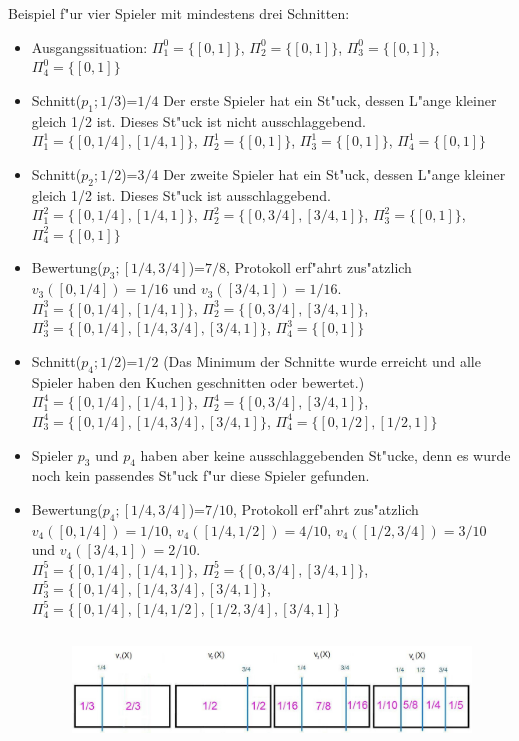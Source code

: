 \documentclass[11pt, a4paper, twoside]{article}
\numberwithin{equation}{section}
\begin{document}
\newline
Beispiel f"ur vier Spieler mit mindestens drei Schnitten:
\begin{itemize}
\item Ausgangssituation: $\Pi_1^0=\{[0,1]\}$, $\Pi_2^0=\{[0,1]\}$, $\Pi_3^0=\{[0,1]\}$, $\Pi_4^0=\{[0,1]\}$
\item  Schnitt($p_1;1/3$)=$1/4$ Der erste Spieler hat ein St"uck, dessen L"ange kleiner gleich 1/2 ist. Dieses St"uck ist nicht ausschlaggebend.\\$\Pi_1^1=\{[0,1/4],[1/4,1]\}$, $\Pi_2^1=\{[0,1]\}$, $\Pi_3^1=\{[0,1]\}$, $\Pi_4^1=\{[0,1]\}$
\item  Schnitt($p_2;1/2$)=$3/4$ Der zweite Spieler hat ein St"uck, dessen L"ange kleiner gleich 1/2 ist. Dieses St"uck ist ausschlaggebend.\\$\Pi_1^2=\{[0,1/4],[1/4,1]\}$, $\Pi_2^2=\{[0,3/4],[3/4,1]\}$, $\Pi_3^2=\{[0,1]\}$, $\Pi_4^2=\{[0,1]\}$
\item  Bewertung($p_3;[1/4,3/4]$)=$7/8$, Protokoll erf"ahrt zus"atzlich $v_3([0,1/4])=1/16$ und $v_3([3/4,1])=1/16$.\\ $\Pi_1^3=\{[0,1/4],[1/4,1]\}$, $\Pi_2^3=\{[0,3/4],[3/4,1]\}$, $\Pi_3^3=\{[0,1/4],[1/4,3/4],[3/4,1]\}$, $\Pi_4^3=\{[0,1]\}$
\item  Schnitt($p_4;1/2$)=$1/2$ (Das Minimum der Schnitte wurde erreicht und alle Spieler haben den Kuchen geschnitten oder bewertet.)\\ $\Pi_1^4=\{[0,1/4],[1/4,1]\}$, $\Pi_2^4=\{[0,3/4],[3/4,1]\}$, $\Pi_3^4=\{[0,1/4],[1/4,3/4],[3/4,1]\}$, $\Pi_4^4=\{[0,1/2],[1/2,1]\}$
\item Spieler $p_3$ und $p_4$ haben aber keine ausschlaggebenden St"ucke, denn es wurde noch kein passendes St"uck f"ur diese Spieler gefunden.
\item  Bewertung($p_4;[1/4,3/4]$)=$7/10$, Protokoll erf"ahrt zus"atzlich $v_4([0,1/4])=1/10$, $v_4([1/4,1/2])=4/10$, $v_4([1/2,3/4])=3/10$ und $v_4([3/4,1])=2/10$.\\ $\Pi_1^5=\{[0,1/4],[1/4,1]\}$, $\Pi_2^5=\{[0,3/4],[3/4,1]\}$, $\Pi_3^5=\{[0,1/4],[1/4,3/4],[3/4,1]\}$, $\Pi_4^5=\{[0,1/4],[1/4,1/2],[1/2,3/4],[3/4,1]\}$
\begin{figure}[h!]
\center
\includegraphics[height=3cm]{kk5.jpg}

\end{figure}
\end{itemize}
\end{document}
